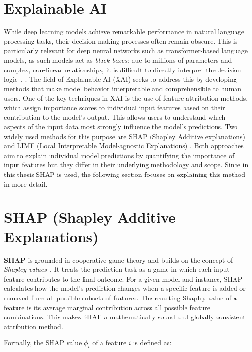 \section{Explainable AI}

While deep learning models achieve remarkable performance in natural language processing tasks, their decision-making processes often remain obscure. This is particularly relevant for deep neural networks such as transformer-based language models, as such models act as \emph{black boxes}: due to millions of parameters and complex, non-linear relationships, it is difficult to directly interpret the decision logic~\cite{bilal2025}, \cite{ali2022}. The field of Explainable AI (XAI) seeks to address this by developing methods that make model behavior interpretable and comprehensible to human users. %
One of the key techniques in XAI is the use of feature attribution methods, which assign importance scores to individual input features based on their contribution to the model's output. This allows users to understand which aspects of the input data most strongly influence the model's predictions. Two widely used methods for this purpose are SHAP (Shapley Additive explanations) \cite{lundberg2017shap} and LIME (Local Interpretable Model-agnostic Explanations) \cite{ribeiro2016lime}. Both approaches aim to explain individual model predictions by quantifying the importance of input features but they differ in their underlying methodology and scope. Since in this thesis SHAP is used, the following section focuses on explaining this method in more detail. %


\section{SHAP (Shapley Additive Explanations)}
\textbf{SHAP} is grounded in cooperative game theory and builds on the concept of \emph{Shapley values}~\cite{lundberg2017shap}. It treats the prediction task as a game in which each input feature contributes to the final outcome. For a given model and instance, SHAP calculates how the model's prediction changes when a specific feature is added or removed from all possible subsets of features. The resulting Shapley value of a feature is its average marginal contribution across all possible feature combinations. This makes SHAP a mathematically sound and globally consistent attribution method. \cite{lundberg2017shap}

Formally, the SHAP value $\phi_i$ of a feature $i$ is defined as:

